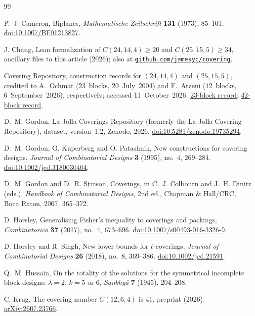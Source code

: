 \documentclass[11pt,letterpaper]{article}
\theoremstyle{definition}\newtheorem{definition}[theorem]{Definition}
\theoremstyle{remark}\newtheorem{remark}[theorem]{Remark}
\begin{document}
\begin{thebibliography}{99}
\raggedright
{}
P.~J. Cameron, Biplanes,
\emph{Mathematische Zeitschrift} \textbf{131} (1973), 85--101.
\href{https://doi.org/10.1007/BF01213827}{doi:10.1007/BF01213827}.

J. Chang, Lean formalization of $C(24,14,4)\ge20$ and $C(25,15,5)\ge34$,
ancillary files to this article (2026); also at
\href{https://github.com/jamesyc/covering}{\nolinkurl{github.com/jamesyc/covering}}.

Covering Repository, construction records for $(24,14,4)$ and $(25,15,5)$,
credited to A.~Ochmat (23~blocks, 20~July~2004) and F.~Atzeni
(42~blocks, 6~September~2026), respectively; accessed 11~October~2026.
\href{https://coveringrepository.com/download_system.aspx?id=134861}{23-block record};
\href{https://coveringrepository.com/download_system.aspx?id=219128}{42-block record}.

D.~M. Gordon, La Jolla Coverings Repository (formerly the La Jolla Covering Repository), dataset, version~1.2, Zenodo, 2026.
\href{https://doi.org/10.5281/zenodo.19735294}{doi:10.5281/zenodo.19735294}.

D.~M. Gordon, G. Kuperberg and O. Patashnik, New constructions for covering designs,
\emph{Journal of Combinatorial Designs} \textbf{3} (1995), no.~4, 269--284.
\href{https://doi.org/10.1002/jcd.3180030404}{doi:10.1002/jcd.3180030404}.

D.~M. Gordon and D.~R. Stinson, Coverings, in C.~J. Colbourn and J.~H. Dinitz (eds.),
\emph{Handbook of Combinatorial Designs}, 2nd ed., Chapman \& Hall/CRC, Boca Raton, 2007, 365--372.

D. Horsley, Generalising Fisher's inequality to coverings and packings,
\emph{Combinatorica} \textbf{37} (2017), no.~4, 673--696.
\href{https://doi.org/10.1007/s00493-016-3326-9}{doi:10.1007/s00493-016-3326-9}.

D. Horsley and R. Singh, New lower bounds for $t$-coverings,
\emph{Journal of Combinatorial Designs} \textbf{26} (2018), no.~8, 369--386.
\href{https://doi.org/10.1002/jcd.21591}{doi:10.1002/jcd.21591}.

Q.~M. Hussain, On the totality of the solutions for the symmetrical incomplete block designs: $\lambda=2$, $k=5$ or $6$,
\emph{Sankhy\=a} \textbf{7} (1945), 204--208.

C. Krug, The covering number $C(12,6,4)$ is $41$, preprint (2026).
\href{https://arxiv.org/abs/2607.23766}{arXiv:2607.23766}.


\end{thebibliography}
\end{document}
